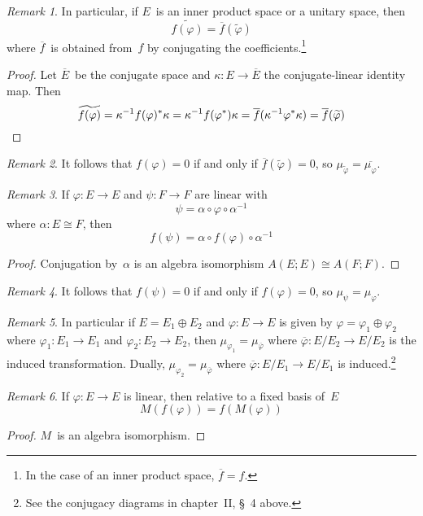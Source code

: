 \documentclass[letterpaper,12pt]{article}
\newcommand{\iso}{\cong}
\newcommand{\after}{\circ}
\newcommand{\dsum}{\oplus}
\newcommand{\adj}[1]{\widetilde{#1}}
\newcommand{\conj}[1]{\overline{#1}}
\newcommand{\proj}[1]{\overline{#1}}
\theoremstyle{definition}
\theoremstyle{remark}
\newtheorem*{rmk}{Remark}
\begin{document}
\begin{rmk}
In particular, if \(E\)~is an inner product space or a unitary space, then
\[\adj{f(\varphi)}=\conj{f}(\adj{\varphi})\]
where \(\conj{f}\)~is obtained from~\(f\) by conjugating the coefficients.\footnote{In the case of an inner product space, \(\conj{f}=f\).}
\end{rmk}
\begin{proof}
Let \(\conj{E}\)~be the conjugate space and \(\kappa:E\to\conj{E}\) the conjugate-linear identity map. Then
\[\adj{f(\varphi)}=\kappa^{-1}f(\varphi)^*\kappa=\kappa^{-1}f(\varphi^*)\kappa=\conj{f}(\kappa^{-1}\varphi^*\kappa)=\conj{f}(\adj{\varphi})\qedhere\]
\end{proof}

\begin{rmk}
It follows that \(f(\varphi)=0\) if and only if \(\conj{f}(\adj{\varphi})=0\), so \(\mu_{\adj{\varphi}}=\conj{\mu_{\varphi}}\).
\end{rmk}

\begin{rmk}
If \(\varphi:E\to E\) and \(\psi:F\to F\) are linear with
\[\psi=\alpha\after\varphi\after\alpha^{-1}\]
where \(\alpha:E\iso F\), then
\[f(\psi)=\alpha\after f(\varphi)\after\alpha^{-1}\]
\end{rmk}
\begin{proof}
Conjugation by~\(\alpha\) is an algebra isomorphism \(A(E;E)\iso A(F;F)\).
\end{proof}

\begin{rmk}
It follows that \(f(\psi)=0\) if and only if \(f(\varphi)=0\), so \(\mu_{\psi}=\mu_{\varphi}\).
\end{rmk}

\begin{rmk}
In particular if \(E=E_1\dsum E_2\) and \(\varphi:E\to E\) is given by \(\varphi=\varphi_1\dsum\varphi_2\) where \(\varphi_1:E_1\to E_1\) and \(\varphi_2:E_2\to E_2\), then \(\mu_{\varphi_1}=\mu_{\proj{\varphi}}\) where \(\proj{\varphi}:E/E_2\to E/E_2\) is the induced transformation. Dually, \(\mu_{\varphi_2}=\mu_{\proj{\varphi}}\) where \(\proj{\varphi}:E/E_1\to E/E_1\) is induced.\footnote{See the conjugacy diagrams in chapter~II, \S~4 above.}
\end{rmk}

\begin{rmk}
If \(\varphi:E\to E\) is linear, then relative to a fixed basis of~\(E\)
\[M(f(\varphi))=f(M(\varphi))\]
\end{rmk}
\begin{proof}
\(M\)~is an algebra isomorphism.
\end{proof}
\end{document}
